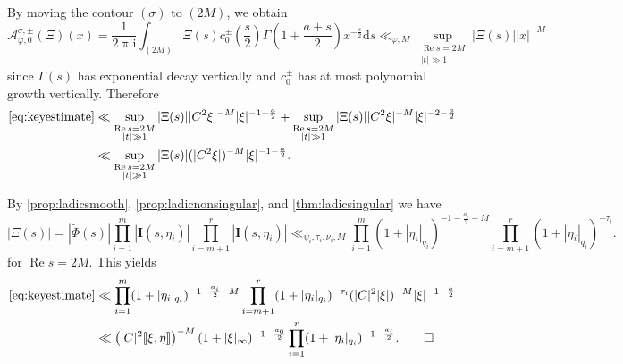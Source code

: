\documentclass[10pt,oneside,reqno]{amsart}
\makeatletter
\newcommand\rmd{\mathrm{d}}
\newcommand\rmi{\mathrm{i}}
\newcommand\cA{\mathcal{A}}
\newcommand\bI{\mathbf{I}}
\newcommand\dpii{2\uppi\rmi}
\renewcommand\Re{\mathop{\mathrm{Re}}}
\newcommand\legendresymbol[2]{\genfrac{(}{)}{}{}{#1}{#2}}
\theoremstyle{THEOREM}
\theoremstyle{DEFINITION}
\theoremstyle{EXERCISE}
\numberwithin{equation}{section}
\renewenvironment{proof}[1][\proofname]{\par
  \vspace{-6pt}
  \pushQED{\qed}
  \normalfont \topsep6\p@\@plus6\p@\relax
  \trivlist
  \item[\hskip\labelsep\rmfamily\bfseries
    #1\@addpunct{:}]\ignorespaces
}{
  \popQED\endtrivlist\@endpefalse
  \vspace{-6pt}
}
\makeatother
\begin{document}
\begin{proof}[Proof of \autoref{thm:mainfourierestimate}]
By moving the contour $(\sigma)$ to $(2M)$, we obtain
\[
\cA_{\varphi,0}^{\sigma,\pm}(\Xi)(x)=\frac{1}{\dpii}\int_{(2M)}\Xi(s) c_0^\pm\legendresymbol{s}{2}\Gamma\left(1+\frac{a+s}{2}\right)x^{-\frac s2}\rmd s \ll_{\varphi,M}  \sup_{\substack{\Re s=2M \\ |t|\gg 1}}|\Xi(s)||x|^{-M}
\]
since $\Gamma(s)$ has exponential decay vertically and $c_0^\pm$ has at most polynomial growth vertically. Therefore
\begin{align*}
  \eqref{eq:keyestimate} & \ll  \sup_{\substack{\Re s=2M \\ |t|\gg 1}}|\Xi(s)||C^2\xi|^{-M}|\xi|^{-1-\frac{a}{2}}+ \sup_{\substack{\Re s=2M \\ |t|\gg 1}}|\Xi(s)||C^2\xi|^{-M}|\xi|^{-2-\frac{a}{2}} \\
   & \ll \sup_{\substack{\Re s=2M \\ |t|\gg 1}}|\Xi(s)|(|C^2\xi|)^{-M}|\xi|^{-1-\frac{a}{2}}.
\end{align*}

By \autoref{prop:ladicsmooth}, \autoref{prop:ladicnonsingular}, and \autoref{thm:ladicsingular} we have
\[
|\Xi(s)|=|\widetilde{\Phi}(s)|\prod_{i=1}^{m}|\bI(s,\eta_i)|\prod_{i=m+1}^{r}|\bI(s,\eta_i)| \ll_{\psi_i,\tau_i,\nu_i,M} \prod_{i=1}^{m}(1+|\eta_i|_{q_i})^{-1-\frac{a_i}{2}-M}\prod_{i=m+1}^{r}(1+|\eta_i|_{q_i})^{-\tau_i}.
\]
for $\Re s=2M$.
This yields
\begin{align*}
  \eqref{eq:keyestimate} & \ll \prod_{i=1}^{m}(1+|\eta_i|_{q_i})^{-1-\frac{a_i}{2}-M}\prod_{i=m+1}^{r}(1+|\eta_i|_{q_i})^{-\tau_i} (|C|^2|\xi|)^{-M}|\xi|^{-1-\frac{a}{2}}\\
   &  \ll \left(|C|^2\llbracket\xi,\eta\rrbracket\right)^{-M} (1+|\xi|_\infty)^{-1-\frac{a_0}{2}}\prod_{i=1}^{r}(1+|\eta_i|_{q_i})^{-1-\frac{a_i}{2}}.\qedhere
\end{align*}
\end{proof}
\end{document}
